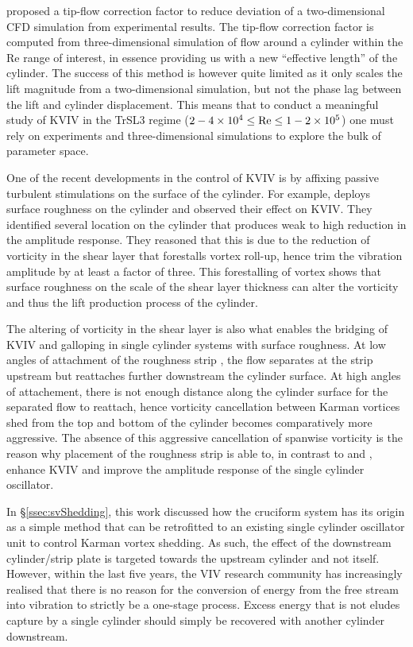 \documentclass[oneside]{utmthesis}
\begin{document}
\citet{Kinaci2016} proposed a tip-flow correction factor to reduce deviation of a two-dimensional CFD simulation from experimental results. The tip-flow correction factor is computed from three-dimensional simulation of flow around a cylinder within the Re range of interest, in essence providing us with a new ``effective length'' of the cylinder. The success of this method is however quite limited as it only scales the lift magnitude from a two-dimensional simulation, but not the phase lag between the lift and cylinder displacement. This means that to conduct a meaningful study of KVIV in the TrSL3 regime ($2 - 4 \times 10^{4} \leq \text{Re} \leq 1 - 2 \times 10^{5}$) one must rely on experiments and three-dimensional simulations to explore the bulk of parameter space.

One of the recent developments in the control of KVIV is by affixing passive turbulent stimulations on the surface of the cylinder. For example, \citet{Park2016} deploys surface roughness on the cylinder and observed their effect on KVIV. They identified several location on the cylinder that produces weak to high reduction in the amplitude response. They reasoned that this is due to the reduction of vorticity in the shear layer that forestalls vortex roll-up, hence trim the vibration amplitude by at least a factor of three. This forestalling of vortex shows that surface roughness on the scale of the shear layer thickness can alter the vorticity and thus the lift production process of the cylinder.

The altering of vorticity in the shear layer is also what enables the bridging of KVIV and galloping in single cylinder systems with surface roughness. At low angles of attachment of the roughness strip \citep{Chang2011,Park2013}, the flow separates at the strip upstream but reattaches further downstream the cylinder surface. At high angles of attachement, there is not enough distance along the cylinder surface for the separated flow to reattach, hence vorticity cancellation between Karman vortices shed from the top and bottom of the cylinder becomes comparatively more aggressive. The absence of this aggressive cancellation of spanwise vorticity is the reason why placement of the roughness strip is able to, in contrast to \citet{Bernitsas2008c} and \citet{Park2016}, enhance KVIV and improve the amplitude response of the single cylinder oscillator.

In \S\ref{ssec:svShedding}, this work discussed how the cruciform system has its origin as a simple method that can be retrofitted to an existing single cylinder oscillator unit to control Karman vortex shedding. As such, the effect of the downstream cylinder/strip plate is targeted towards the upstream cylinder and not itself. However, within the last five years, the VIV research community has increasingly realised that there is no reason for the conversion of energy from the free stream into vibration to strictly be a one-stage process. Excess energy that is not eludes capture by a single cylinder should simply be recovered with another cylinder downstream.
\end{document}
